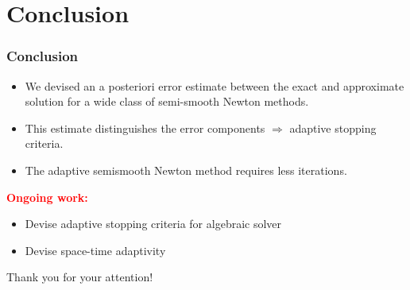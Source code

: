 \documentclass[10 pt]{beamer}
\begin{document}
\section{Conclusion}
\begin{frame}
\frametitle{Conclusion}
\begin{itemize}
\item
We devised an a posteriori error estimate between the exact and approximate solution for a wide class of semi-smooth Newton methods.
\vspace{0.5 cm}
\item 
This estimate distinguishes the error components ${\bm \Rightarrow}$ adaptive stopping criteria.
\vspace{0.5 cm}
\item The adaptive semismooth Newton method requires less iterations.
\end{itemize}
\vspace{1 cm}
\textcolor{red}{\textbf{Ongoing work:}}
\begin{itemize}
\item Devise adaptive stopping criteria for algebraic solver
\item
  Devise space-time adaptivity 
\end{itemize}
\end{frame}

\begin{frame}

\centering
\Huge Thank you for your attention!
\end{frame}
\end{document}
